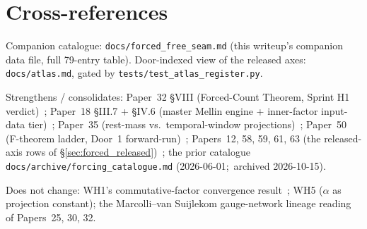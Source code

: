 \documentclass[11pt,a4paper]{article}
\theoremstyle{plain}
\theoremstyle{definition}
\begin{document}
\section*{Cross-references}

Companion catalogue:  \texttt{docs/forced\_free\_seam.md} (this writeup's companion data file, full 79-entry table). Door-indexed view of the released axes:  \texttt{docs/atlas.md}, gated by \texttt{tests/test\_atlas\_register.py}.

Strengthens / consolidates:  Paper~32 \S VIII (Forced-Count Theorem, Sprint H1 verdict)~\cite{paper32}; Paper~18 \S III.7 + \S IV.6 (master Mellin engine + inner-factor input-data tier)~\cite{paper18}; Paper~35 (rest-mass vs.\ temporal-window projections)~\cite{paper35}; Paper~50 (F-theorem ladder, Door~1 forward-run)~\cite{paper50}; Papers~12, 58, 59, 61, 63 (the released-axis rows of \S\ref{sec:forced_released})~\cite{paper12,paper58,paper59,paper61,paper63}; the prior catalogue \texttt{docs/archive/forcing\_catalogue.md} (2026-06-01;\ archived 2026-10-15).

Does not change:  WH1's commutative-factor convergence result~\cite{paper38}; WH5 ($\alpha$ as projection constant); the Marcolli--van Suijlekom gauge-network lineage reading of Papers~25, 30, 32.
\end{document}

